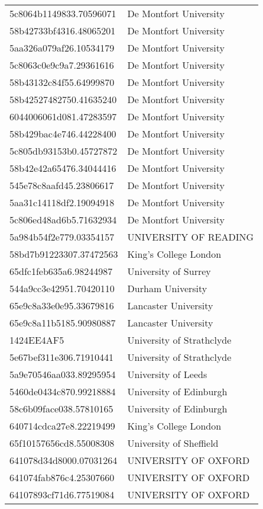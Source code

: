 \begin{tabular}{ll}
5c8064b1149833.70596071 & De Montfort University \\
58b42733bf4316.48065201 & De Montfort University \\
5aa326a079af26.10534179 & De Montfort University \\
5c8063c0e9c9a7.29361616 & De Montfort University \\
58b43132c84f55.64999870 & De Montfort University \\
58b42527482750.41635240 & De Montfort University \\
6044006061d081.47283597 & De Montfort University \\
58b429bac4e746.44228400 & De Montfort University \\
5c805db93153b0.45727872 & De Montfort University \\
58b42e42a65476.34044416 & De Montfort University \\
545e78c8aafd45.23806617 & De Montfort University \\
5aa31c14118df2.19094918 & De Montfort University \\
5c806ed48ad6b5.71632934 & De Montfort University \\
5a984b54f2e779.03354157 & UNIVERSITY OF READING \\
58bd7b91223307.37472563 & King's College London \\
65dfc1feb635a6.98244987 & University of Surrey \\
544a9cc3e42951.70420110 & Durham University \\
65e9c8a33e0e95.33679816 & Lancaster University \\
65e9c8a11b5185.90980887 & Lancaster University \\
1424EE4AF5 & University of Strathclyde \\
5e67bef311e306.71910441 & University of Strathclyde \\
5a9e70546aa033.89295954 & University of Leeds \\
5460de0434c870.99218884 & University of Edinburgh \\
58c6b09face038.57810165 & University of Edinburgh \\
640714cdca27e8.22219499 & King's College London \\
65f10157656cd8.55008308 & University of Sheffield \\
641078d34d8000.07031264 & UNIVERSITY OF OXFORD \\
641074fab876c4.25307660 & UNIVERSITY OF OXFORD \\
64107893cf71d6.77519084 & UNIVERSITY OF OXFORD \\

\end{tabular}
